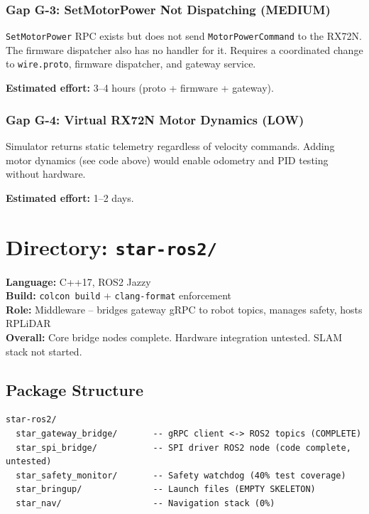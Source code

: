 \documentclass[12pt,a4paper]{article}
\begin{document}
\subsubsection{Gap G-3: SetMotorPower Not Dispatching (MEDIUM)}

\texttt{SetMotorPower} RPC exists but does not send \texttt{MotorPowerCommand} to the RX72N. The firmware dispatcher also has no handler for it. Requires a coordinated change to \texttt{wire.proto}, firmware dispatcher, and gateway service.

\textbf{Estimated effort:} 3--4 hours (proto + firmware + gateway).

\subsubsection{Gap G-4: Virtual RX72N Motor Dynamics (LOW)}

Simulator returns static telemetry regardless of velocity commands. Adding motor dynamics (see code above) would enable odometry and PID testing without hardware.

\textbf{Estimated effort:} 1--2 days.

\newpage

\section{Directory: \texttt{star-ros2/}}

\begin{dirbox}
  \textbf{Language:} C++17, ROS2 Jazzy\\
  \textbf{Build:} \texttt{colcon build} + \texttt{clang-format} enforcement\\
  \textbf{Role:} Middleware -- bridges gateway gRPC to robot topics, manages safety, hosts RPLiDAR\\
  \textbf{Overall:} Core bridge nodes complete. Hardware integration untested. SLAM stack not started.
\end{dirbox}

\subsection{Package Structure}

\begin{lstlisting}[caption={star-ros2/ package layout}]
star-ros2/
  star_gateway_bridge/       -- gRPC client <-> ROS2 topics (COMPLETE)
  star_spi_bridge/           -- SPI driver ROS2 node (code complete, untested)
  star_safety_monitor/       -- Safety watchdog (40% test coverage)
  star_bringup/              -- Launch files (EMPTY SKELETON)
  star_nav/                  -- Navigation stack (0%)
\end{lstlisting}
\end{document}
